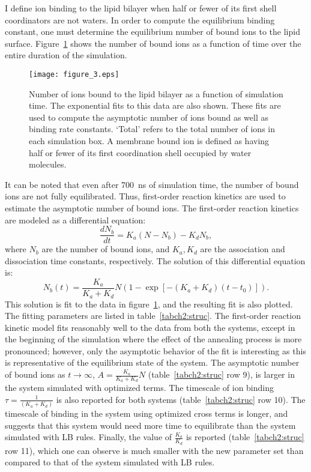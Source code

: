 I define ion binding to the lipid bilayer when half or fewer
of its first shell coordinators are not waters. 
In order to compute the equilibrium binding constant, 
one must determine the equilibrium number of bound ions to the lipid surface. 
Figure~\ref{figch2:ioncoodcount} shows the number of bound ions as a
function of time over the entire duration of the simulation. 
\begin{figure}[H]
    \texttt{[image: figure\_3.eps]}
    \caption[Number of ions bound to the lipid bilayer]{Number of ions bound to the lipid bilayer as a function of simulation time. 
The exponential fits to this data are also shown. These fits are used to compute the asymptotic
number of ions bound as well as binding rate constants.
`Total' refers to the total number of ions in each simulation box.
A membrane bound ion is defined as having half or fewer of its first coordination shell
occupied by water molecules. }
    \label{figch2:ioncoodcount}
\end{figure}
It can be noted that even after 700~ns of simulation time, the number of bound ions
are not fully equilibrated. 
Thus, first-order reaction kinetics are used to
estimate the asymptotic number of bound ions.  
The first-order reaction kinetics are modeled as a differential equation:
\begin{equation}
    \frac{dN_b}{dt}=K_a \left(N-N_b\right)- K_d N_b,
\end{equation}
where $N_b$ are the number of bound ions, and $K_a,K_d$ are the association and dissociation
time constants, respectively.
The solution of this differential equation is:
\begin{equation}
    N_b(t)= \frac{K_{a}}{K_{a}+K_{d}} N
    \left(1-\exp\left[-\left(K_{a}+K_{d}\right)\left(t-t_0\right)\right]\right).
    \label{eq:ioncoodnumfit}
\end{equation}
This solution is fit to the data in figure~\ref{figch2:ioncoodcount}, 
and the resulting fit is also plotted. 
The fitting parameters are listed in table~\ref{tabch2:struc}.
The first-order reaction kinetic model fits reasonably well to the 
data from both the systems, except in the beginning of
the simulation where the effect of the annealing process is more pronounced; 
however, only the asymptotic
behavior of the fit is interesting as this is representative of the equilibrium state of the system. 
The asymptotic number of bound ions as $t\to\infty$, $A=\frac{K_{a}}{K_{a}+K_{d}} N$ 
(table~\ref{tabch2:struc} row 9), is larger in the system simulated with optimized terms.
The timescale of ion binding $\tau=\frac{1}{\left(K_{a}+K_{d}\right)}$ is also reported 
for both systems (table~\ref{tabch2:struc} row 10). 
The timescale of binding in the system using optimized cross terms is longer, 
and suggests that this system would need more time to equilibrate than the system simulated with LB rules.
Finally, the value of $\frac{K_a}{K_d}$ is reported
(table~\ref{tabch2:struc} row 11), which
one can observe is much smaller with the new parameter set than compared to that
of the system simulated with LB rules.

